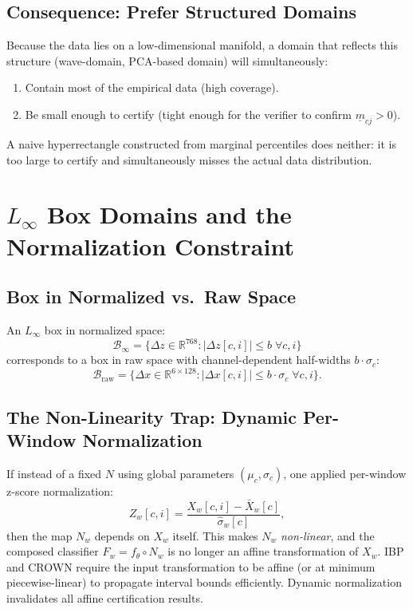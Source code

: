 \documentclass[11pt, a4paper]{article}
\theoremstyle{definition}
\theoremstyle{plain}
\newcommand{\R}{\mathbb{R}}
\begin{document}
\subsection{Consequence: Prefer Structured Domains}

Because the data lies on a low-dimensional manifold, a domain that reflects this
structure (wave-domain, PCA-based domain) will simultaneously:
\begin{enumerate}[leftmargin=1.5em]
  \item Contain most of the empirical data (high coverage).
  \item Be small enough to certify (tight enough for the verifier to confirm $\underline{m}_{cj} > 0$).
\end{enumerate}
A naive hyperrectangle constructed from marginal percentiles does neither: it is
too large to certify and simultaneously misses the actual data distribution.

\section{$L_\infty$ Box Domains and the Normalization Constraint}

\subsection{Box in Normalized vs.\ Raw Space}

An $L_\infty$ box in normalized space:
\[
  \mathcal{B}_\infty = \bigl\{ \Delta z \in \R^{768} : |\Delta z[c,i]| \le b \;\forall c, i \bigr\}
\]
corresponds to a box in raw space with channel-dependent half-widths $b \cdot \sigma_c$:
\[
  \mathcal{B}_{\text{raw}} = \bigl\{ \Delta x \in \R^{6 \times 128} : |\Delta x[c,i]| \le b \cdot \sigma_c \;\forall c, i \bigr\}.
\]

\subsection{The Non-Linearity Trap: Dynamic Per-Window Normalization}

If instead of a fixed $N$ using global parameters $(\mu_c, \sigma_c)$, one applied
per-window z-score normalization:
\[
  Z_w[c, i] = \frac{X_w[c, i] - \bar{X}_w[c]}{\hat{\sigma}_w[c]},
\]
then the map $N_w$ depends on $X_w$ itself. This makes $N_w$ \emph{non-linear},
and the composed classifier $F_w = f_\theta \circ N_w$ is no longer an affine
transformation of $X_w$. IBP and CROWN require the input transformation to be
affine (or at minimum piecewise-linear) to propagate interval bounds efficiently.
Dynamic normalization invalidates all affine certification results.
\end{document}
